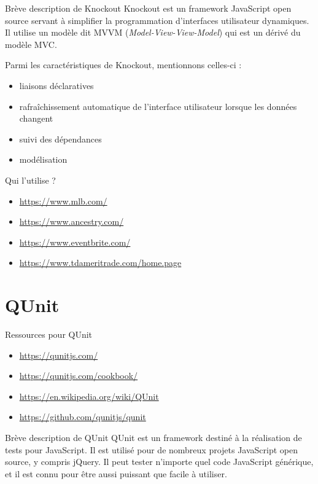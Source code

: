 \documentclass[presentation]{beamer}
\begin{document}
\begin{frame}[label={sec:org10241da}]{Brève description de Knockout}
Knockout est un framework JavaScript open source servant à
simplifier la programmation d'interfaces utilisateur dynamiques. Il
utilise un modèle dit MVVM (\emph{Model-View-View-Model}) qui est un
dérivé du modèle MVC.

Parmi les caractéristiques de Knockout, mentionnons celles-ci : 
\begin{itemize}
\item liaisons déclaratives
\item rafraîchissement automatique de l'interface utilisateur lorsque
les données changent
\item suivi des dépendances
\item modélisation
\end{itemize}
\end{frame}

\begin{frame}[label={sec:org82347f9}]{Qui l'utilise ?}
\begin{itemize}
\item \url{https://www.mlb.com/}
\item \url{https://www.ancestry.com/}
\item \url{https://www.eventbrite.com/}
\item \url{https://www.tdameritrade.com/home.page}
\end{itemize}
\end{frame}

\section{QUnit}
\label{sec:org56a00d4}
\begin{frame}[label={sec:org0e04aed}]{Ressources pour QUnit}
\begin{itemize}
\item \url{https://qunitjs.com/}
\item \url{https://qunitjs.com/cookbook/}
\item \url{https://en.wikipedia.org/wiki/QUnit}
\item \url{https://github.com/qunitjs/qunit}
\end{itemize}
\end{frame}

\begin{frame}[label={sec:orge59b5b0}]{Brève description de QUnit}
QUnit est un framework destiné à la réalisation de tests pour
JavaScript. Il est utilisé pour de nombreux projets JavaScript open
source, y compris jQuery. Il peut tester n'importe quel code
JavaScript générique, et il est connu pour être aussi puissant que
facile à utiliser.
\end{frame}
\end{document}

